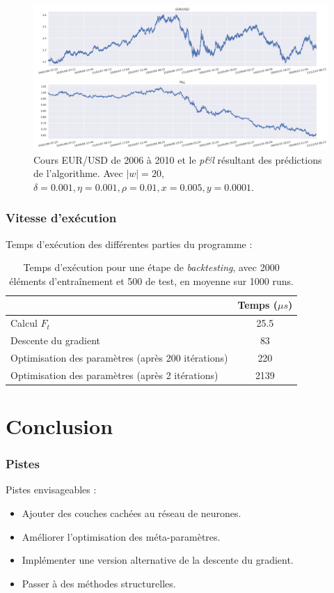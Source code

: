 \documentclass{beamer}
\begin{document}
	\begin{frame}
		\begin{figure}
			\includegraphics[scale=0.275]{res/eursud_2006-2010}
			\caption[Blup]{Cours EUR/USD de 2006 à 2010 et le \textit{p\&l} résultant des prédictions de l'algorithme. Avec $|w| = 20$, $\delta = 0.001, \eta=0.001,\rho=0.01, x = 0.005, y=0.0001$.}
		\end{figure}
	\end{frame}

	\begin{frame}
		\frametitle{Vitesse d'exécution}
		Temps d'exécution des différentes parties du programme :
		\begin{table}
			\centering
			\begin{tabular}{|l|c|}
				\hline
				 & Temps ($\mu s$)\\
				\hline
				Calcul $F_t$ & 25.5\\
				\hline
				Descente du gradient & 83\\
				\hline
				Optimisation des paramètres (après 200 itérations) & 220 \\
				\hline
				Optimisation des paramètres (après 2 itérations) & 2139 \\
				\hline
			\end{tabular}
		\caption{Temps d'exécution pour une étape de \textit{backtesting}, avec 2000 éléments d'entraînement et 500 de test, en moyenne sur 1000 runs.}
		\end{table}
	\end{frame}

	\section{Conclusion}
	
	\begin{frame}
		\frametitle{Pistes}
		Pistes envisageables :
		\begin{itemize}
			\item Ajouter des couches cachées au réseau de neurones.
			\item Améliorer l'optimisation des méta-paramètres.
			\item Implémenter une version alternative de la descente du gradient.
			\item Passer à des méthodes structurelles.
		\end{itemize}
	\end{frame}
\end{document}
